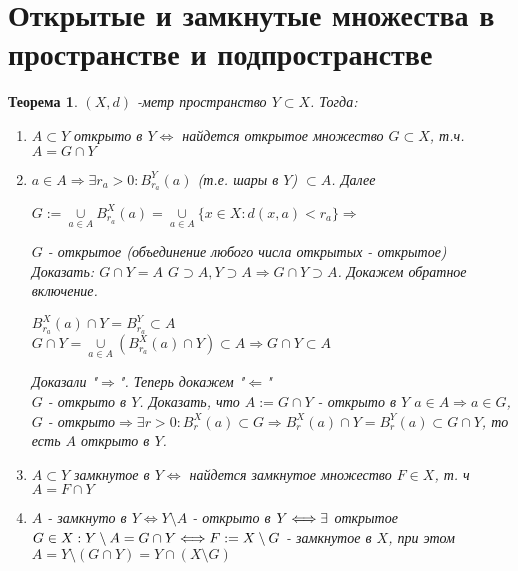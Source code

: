 \documentclass[12pt,letterpaper]{report}
\makeatletter
\newtheorem*{theorem-non}{Теорема}
\theoremstyle{definition}
\renewenvironment{proof}[1][\proofname]{%
   \par\pushQED{\qed}\normalfont%
   \topsep6\p@\@plus6\p@\relax
   \trivlist\item[\hskip\labelsep\bfseries#1\@addpunct{.}]%
   \ignorespaces
}{%
   \popQED\endtrivlist\@endpefalse
}
\makeatother
\begin{document}
\section{Открытые и замкнутые множества в пространстве и подпространстве}
    
    \begin{theorem-non}
        $(X, d)$ -метр пространство $Y \subset X$. Тогда:
        \begin{enumerate}
            \item $A \subset Y$ открыто в $Y \Longleftrightarrow$ найдется открытое множество $G \subset X$, т.ч. $A=G\cap Y$
            \begin{proof}
                $a \in A \Longrightarrow \exists r_a>0 : B_{r_a}^Y(a)$ (т.е. шары в $Y$) $\subset A$. Далее
                \begin{center}
                    $G:= \underset{a\in A}{\cup} B_{r_a}^X(a) = \underset{a\in A}{\cup} \{x \in X: d(x, a)<r_a\} \Longrightarrow$
                \end{center}
                $G$ - открытое (объединение любого числа открытых - открытое)
                Доказать: $G\cap Y = A$
                $G \supset A, Y \supset A \Longrightarrow G\cap Y \supset A$. Докажем обратное включение.
                \begin{center}
                    $B_{r_a}^X(a)\cap Y = B_{r_a}^Y \subset A$ \vspace*{0,2cm} \\
                    $G\cap Y = \underset{a\in A}{\cup}(B_{r_a}^X(a) \cap Y) \subset A \Longrightarrow G\cap Y \subset A$
                \end{center}
                Доказали "$\Longrightarrow$". Теперь докажем "$\Longleftarrow$"\\
                $G$ - открыто в $Y$. Доказать, что $A := G\cap Y$ - открыто в $Y$
                $a \in A \Longrightarrow a \in G$, $G$ - открыто$ \Longrightarrow \exists r>0 : B_r^X(a) \subset G \Longrightarrow B_r^X(a)\cap Y = B_r^Y(a) \subset G\cap Y$, то есть $A$ открыто в $Y$.
            \end{proof}
            \item $A \subset Y$ замкнутое в $Y \Longleftrightarrow$ найдется замкнутое множество $F \in X $, т. ч $A = F\cap Y$
            \begin{proof}
                $A$ - замкнуто в $Y \Longleftrightarrow Y\setminus A$ - открыто в $Y \Longleftrightarrow \\
                \exists$ открытое $G \in X : Y\setminus A = G\cap Y \Longleftrightarrow \\
                F := X\setminus G$ - замкнутое в $X$, при этом $A = Y\setminus (G\cap Y) = Y\cap (X\setminus G)$ \vspace*{0,2cm}\\
                 \par
            \end{proof}
        \end{enumerate}
    \end{theorem-non}
    
\end{document}

